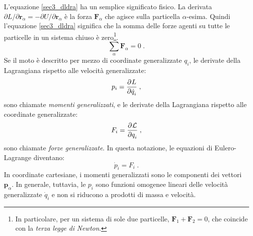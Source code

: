 L'equazione \eqref{sec3_dldra} ha un semplice significato fisico. La derivata $\partial L/\partial\mathbf{r}_{\alpha}=-
\partial U/\partial\mathbf{r}_{\alpha}$ è la forza $\mathbf{F}_{\alpha}$ che agisce sulla particella $\alpha$-esima. Quindi l'equazione \eqref{sec3_dldra} significa che la somma delle forze agenti su tutte le particelle in un sistema chiuso è zero\footnote{In particolare, per un sistema di sole due particelle, $\mathbf{F}_1+\mathbf{F}_2=0$, che coincide con la \textit{terza legge di Newton}.}.
\begin{equation}
\sum_{\alpha} \mathbf{F}_{\alpha}=0\;.
\end{equation}
Se il moto è descritto per mezzo di coordinate generalizzate $q_i$, le derivate della Lagrangiana rispetto alle velocità generalizzate:
\begin{equation}
p_i=\frac{\partial^{}L}{\partial \dot{q}_i^{}}\;,
\end{equation}
sono chiamate \textit{momenti generalizzati}, e le derivate della Lagrangiana rispetto alle coordinate generalizzate:
\begin{equation}
F_i=\frac{\partial^{}\mathcal{L}}{\partial q_i^{}}\;,
\end{equation}
sono chiamate \textit{forze generalizzate}. In questa notazione, le equazioni di Eulero-Lagrange diventano:
\begin{equation}
\dot{p}_i=F_i\;.
\end{equation}
In coordinate cartesiane, i momenti generalizzati sono le componenti dei vettori $\mathbf{p}_{\alpha}$. In generale, tuttavia, le $p_i$ sono funzioni omogenee lineari delle velocità generalizzate $\dot{q}_i$ e non si riducono a prodotti di massa e velocità.
